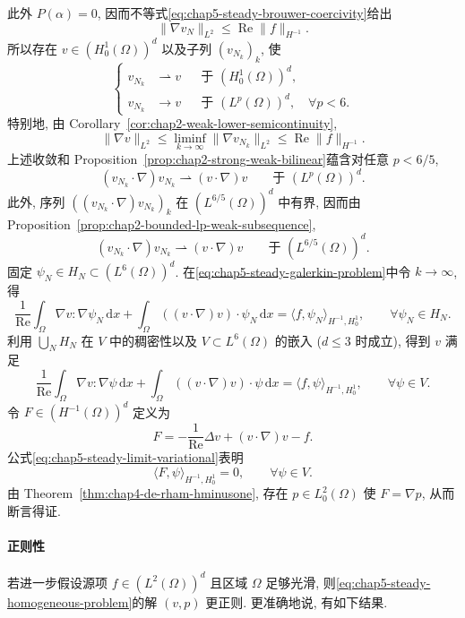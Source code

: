 \begin{Proof}
此外 $P(\alpha)=0$, 因而不等式\eqref{eq:chap5-steady-brouwer-coercivity}给出
\[
 \|\nabla v_N\|_{L^2}\leq\operatorname{Re}\|f\|_{H^{-1}}.
\]
所以存在 $v\in(H_0^1(\Omega))^d$ 以及子列 $(v_{N_k})_k$, 使
\[
 \left\{
 \begin{aligned}
 v_{N_k}&\rightharpoonup v&&\text{于 }(H_0^1(\Omega))^d,\\
 v_{N_k}&\longrightarrow v&&\text{于 }(L^p(\Omega))^d,\quad\forall p<6.
 \end{aligned}
 \right.
\]
特别地, 由 Corollary~\ref{cor:chap2-weak-lower-semicontinuity},
\[
 \|\nabla v\|_{L^2}\leq\liminf_{k\to\infty}\|\nabla v_{N_k}\|_{L^2}
 \leq\operatorname{Re}\|f\|_{H^{-1}}.
\]
上述收敛和 Proposition~\ref{prop:chap2-strong-weak-bilinear}蕴含对任意 $p<6/5$,
\[
 (v_{N_k}\cdot\nabla)v_{N_k}\rightharpoonup(v\cdot\nabla)v
 \qquad\text{于 }(L^p(\Omega))^d.
\]
此外, 序列 $((v_{N_k}\cdot\nabla)v_{N_k})_k$ 在 $(L^{6/5}(\Omega))^d$ 中有界, 因而由 Proposition~\ref{prop:chap2-bounded-lp-weak-subsequence},
\[
 (v_{N_k}\cdot\nabla)v_{N_k}\rightharpoonup(v\cdot\nabla)v
 \qquad\text{于 }(L^{6/5}(\Omega))^d.
\]
固定 $\psi_N\in H_N\subset(L^6(\Omega))^d$. 在\eqref{eq:chap5-steady-galerkin-problem}中令 $k\to\infty$, 得
\[
 \frac1{\operatorname{Re}}\int_\Omega\nabla v:\nabla\psi_N\,\mathrm dx
 +\int_\Omega((v\cdot\nabla)v)\cdot\psi_N\,\mathrm dx
 =\langle f,\psi_N\rangle_{H^{-1},H_0^1},
 \qquad\forall\psi_N\in H_N.
\]
利用 $\bigcup_NH_N$ 在 $V$ 中的稠密性以及 $V\subset L^6(\Omega)$ 的嵌入 ($d\leq3$ 时成立), 得到 $v$ 满足
\begin{equation}
 \frac1{\operatorname{Re}}\int_\Omega\nabla v:\nabla\psi\,\mathrm dx
 +\int_\Omega((v\cdot\nabla)v)\cdot\psi\,\mathrm dx
 =\langle f,\psi\rangle_{H^{-1},H_0^1},
 \qquad\forall\psi\in V.
\label{eq:chap5-steady-limit-variational}
\end{equation}
令 $F\in(H^{-1}(\Omega))^d$ 定义为
\[
 F=-\frac1{\operatorname{Re}}\Delta v+(v\cdot\nabla)v-f.
\]
公式\eqref{eq:chap5-steady-limit-variational}表明
\[
 \langle F,\psi\rangle_{H^{-1},H_0^1}=0,
 \qquad\forall\psi\in V.
\]
由 Theorem~\ref{thm:chap4-de-rham-hminusone}, 存在 $p\in L_0^2(\Omega)$ 使 $F=\nabla p$, 从而断言得证.
\end{Proof}

\paragraph{正则性}
\label{subsec:chap5-steady-homogeneous-regularity}

若进一步假设源项 $f\in(L^2(\Omega))^d$ 且区域 $\Omega$ 足够光滑, 则\eqref{eq:chap5-steady-homogeneous-problem}的解 $(v,p)$ 更正则. 更准确地说, 有如下结果.

